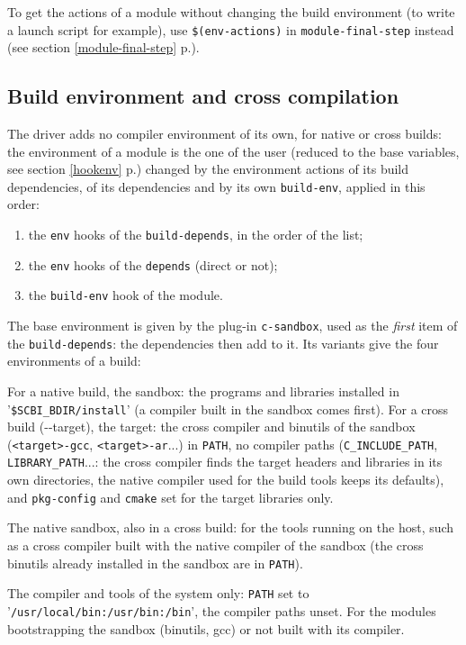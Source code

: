 \documentclass[a4paper,12pt,twoside]{article}
\newcommand{\code}[1]{\texttt{#1}}
\renewcommand{\emph}[1]{\textit{#1}}
\newcommand{\seeref}[1]{see section \ref{#1} p.\pageref{#1}}
\newcommand{\file}[1]{'{\texttt{#1}}'}
\newcommand{\ddash}{-{}-}
\begin{document}
To get the actions of a module without changing the build environment
(to write a launch script for example), use \code{\$(env-actions)} in
\code{module-final-step} instead (\seeref{module-final-step}).

\subsection{Build environment and cross compilation}
\label{build-environment}

The driver adds no compiler environment of its own, for native or cross
builds: the environment of a module is the one of the user (reduced to the
base variables, \seeref{hookenv}) changed by the environment actions of its
build dependencies, of its dependencies and by its own \code{build-env},
applied in this order:

\begin{enumerate}
	\item the \code{env} hooks of the \code{build-depends}, in the order of
	the list;
	\item the \code{env} hooks of the \code{depends} (direct or not);
	\item the \code{build-env} hook of the module.
\end{enumerate}

The base environment is given by the plug-in \code{c-sandbox}, used as the
\emph{first} item of the \code{build-depends}: the dependencies then add
to it. Its variants give the four environments of a build:

\begin{description}[style=nextline]
	\item[c-sandbox] For a native build, the sandbox: the programs and
	libraries installed in \file{\$SCBI\_BDIR/install} (a compiler built in
	the sandbox comes first). For a cross build (\ddash{}target), the target:
	the cross compiler and binutils of the sandbox (\code{<target>-gcc},
	\code{<target>-ar}...) in \code{PATH}, no compiler paths
	(\code{C\_INCLUDE\_PATH}, \code{LIBRARY\_PATH}...: the cross compiler
	finds the target headers and libraries in its own directories, the
	native compiler used for the build tools keeps its defaults), and
	\code{pkg-config} and \code{cmake} set for the target libraries only.
	\item[c-sandbox/host] The native sandbox, also in a cross build: for the
	tools running on the host, such as a cross compiler built with the
	native compiler of the sandbox (the cross binutils already installed in
	the sandbox are in \code{PATH}).
	\item[c-sandbox/system] The compiler and tools of the system only:
	\code{PATH} set to \file{/usr/local/bin:/usr/bin:/bin}, the compiler
	paths unset. For the modules bootstrapping the sandbox (binutils, gcc)
	or not built with its compiler.
\end{description}
\end{document}
